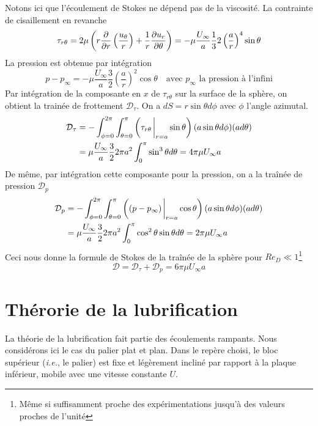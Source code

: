     Notons ici que l'écoulement de Stokes ne dépend pas de la viscosité. La contrainte de cisaillement en revanche
    \begin{equation}
      \tau_{r\theta} = 2 \mu \left(r \pdv{r} \left(\frac{u_\theta}{r}\right) + \frac{1}{r}\pdv{u_r}{\theta}\right) = - \mu \frac{U_\infty}{a} \frac{1}{3}{2} \left(\frac{a}{r}\right)^4 \sin \theta
    \end{equation}
    La pression est obtenue par intégration
    \begin{equation}
      p-p_\infty = -\mu \frac{U_\infty}{a} \frac{3}{2} \left(\frac{a}{r}\right)^2 \cos \theta \quad \textrm{avec } p_\infty \textrm{ la pression à l'infini}
    \end{equation}
    Par intégration de la composante en $x$ de $\tau_{r\theta}$ sur la surface de la sphère, on obtient la trainée de frottement $\mathcal{D}_\tau$. On a $dS = r\sin\theta d\phi$ avec $\phi$ l'angle azimutal.
    \begin{equation}
      \begin{aligned}
        \mathcal{D}_\tau &= - \int_{\phi=0}^{2\pi} \int_{\theta=0}^\pi \left(\tau_{r\theta}\eval_{r=a} \sin \theta \right) (a \sin\theta d\phi) (a d\theta)\\
        &= \mu \frac{U_\infty}{a} \frac{3}{2} 2\pi a^2 \int_0^\pi \sin^3 \theta d\theta = 4\pi \mu U_\infty a
      \end{aligned}
    \end{equation}
    De même, par intégration cette composante pour la pression, on a la traînée de pression $\mathcal{D}_p$
    \begin{equation}
      \begin{aligned}
        \mathcal{D}_p &= -\int_{\phi=0}^{2\pi} \int_{\theta=0}^\pi \left((p-p_\infty)\eval_{r=a} \cos\theta\right) (a \sin\theta d\phi)(a d\theta)\\
        &= \mu \frac{U_\infty}{a}\frac{3}{2} 2\pi a^2 \int_0^\pi \cos^2 \theta \sin\theta d\theta = 2\pi \mu U_\infty a
      \end{aligned}
    \end{equation}
    Ceci nous donne la formule de Stokes de la traînée de la sphère pour $Re_D \ll 1$\footnote{Même si suffisamment proche des expérimentations jusqu'à des valeurs proches de l'unité}
    \begin{equation}
      \mathcal{D} = \mathcal{D}_\tau + \mathcal{D}_p = 6\pi\mu U_\infty a
    \end{equation}

  \section{Thérorie de la lubrification}
    La théorie de la lubrification fait partie des écoulements rampants. Nous considérons ici le cas du palier plat et plan. Dans le repère choisi, le bloc supérieur (\textit{i.e.}, le palier) est fixe et légèrement incliné par rapport à la plaque inférieur, mobile avec une vitesse constante $U$.


